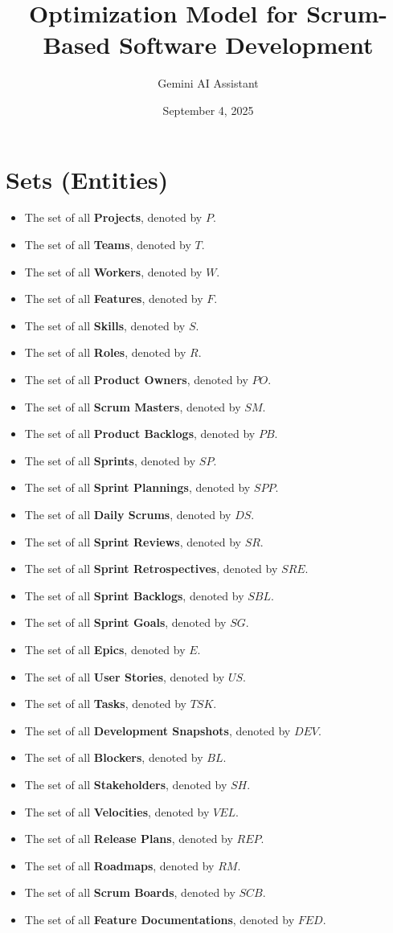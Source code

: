 \documentclass{article}
\title{Optimization Model for Scrum-Based Software Development}
\author{Gemini AI Assistant}
\date{September 4, 2025}
\begin{document}
\maketitle
\tableofcontents
\newpage

\section{Sets (Entities)}
\begin{itemize}
    \item The set of all \textbf{Projects}, denoted by $P$.
    \item The set of all \textbf{Teams}, denoted by $T$.
    \item The set of all \textbf{Workers}, denoted by $W$.
    \item The set of all \textbf{Features}, denoted by $F$.
    \item The set of all \textbf{Skills}, denoted by $S$.
    \item The set of all \textbf{Roles}, denoted by $R$.
    \item The set of all \textbf{Product Owners}, denoted by $PO$.
    \item The set of all \textbf{Scrum Masters}, denoted by $SM$.
    \item The set of all \textbf{Product Backlogs}, denoted by $PB$.
    \item The set of all \textbf{Sprints}, denoted by $SP$.
    \item The set of all \textbf{Sprint Plannings}, denoted by $SPP$.
    \item The set of all \textbf{Daily Scrums}, denoted by $DS$.
    \item The set of all \textbf{Sprint Reviews}, denoted by $SR$.
    \item The set of all \textbf{Sprint Retrospectives}, denoted by $SRE$.
    \item The set of all \textbf{Sprint Backlogs}, denoted by $SBL$.
    \item The set of all \textbf{Sprint Goals}, denoted by $SG$.
    \item The set of all \textbf{Epics}, denoted by $E$.
    \item The set of all \textbf{User Stories}, denoted by $US$.
    \item The set of all \textbf{Tasks}, denoted by $TSK$.
    \item The set of all \textbf{Development Snapshots}, denoted by $DEV$.
    \item The set of all \textbf{Blockers}, denoted by $BL$.
    \item The set of all \textbf{Stakeholders}, denoted by $SH$.
    \item The set of all \textbf{Velocities}, denoted by $VEL$.
    \item The set of all \textbf{Release Plans}, denoted by $REP$.
    \item The set of all \textbf{Roadmaps}, denoted by $RM$.
    \item The set of all \textbf{Scrum Boards}, denoted by $SCB$.
    \item The set of all \textbf{Feature Documentations}, denoted by $FED$.
\end{itemize}
\end{document}
